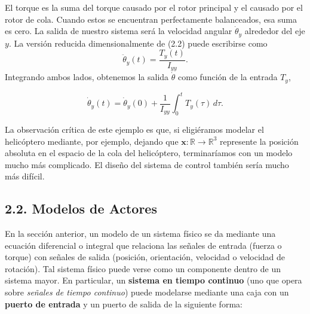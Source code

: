 \documentclass[12pt,a4paper]{article}
\begin{document}
\thispagestyle{fancy}
\fancyhf{} 
\fancyhead[L]{\textit{\textcolor{black}{2.2 MODELO DE ACTORES}}}

\begin{tcolorbox}[colback=blue!10,colframe=blue!40!black]
El torque es la suma del torque causado por el rotor principal y el causado por el rotor de cola. 
Cuando estos se encuentran perfectamente balanceados, esa suma es cero. 
La salida de nuestro sistema será la velocidad angular $\dot{\theta}_y$ alrededor del eje $y$. 
La versión reducida dimensionalmente de (2.2) puede escribirse como
\[
\ddot{\theta}_y(t) = \frac{T_y(t)}{I_{yy}}.
\]
Integrando ambos lados, obtenemos la salida $\dot{\theta}$ como función de la entrada $T_y$,

\[
\dot{\theta}_y(t) = \dot{\theta}_y(0) + \frac{1}{I_{yy}} \int_{0}^{t} T_y(\tau) \, d\tau. \tag{2.4}
\]
\end{tcolorbox}

La observación crítica de este ejemplo es que, si eligiéramos modelar el helicóptero mediante, por ejemplo, 
dejando que $\mathbf{x}: \mathbb{R} \to \mathbb{R}^3$ represente la posición absoluta en el espacio de la cola del helicóptero, 
terminaríamos con un modelo mucho más complicado. 
El diseño del sistema de control también sería mucho más difícil.

\subsection*{2.2. Modelos de Actores}
En la sección anterior, un modelo de un sistema físico se da mediante una ecuación diferencial o integral 
que relaciona las señales de entrada (fuerza o torque) con señales de salida (posición, orientación, velocidad 
o velocidad de rotación). Tal sistema físico puede verse como un componente dentro de un sistema mayor. 
En particular, un \textbf{sistema en tiempo continuo} (uno que opera sobre \textit{señales de tiempo continuo}) 
puede modelarse mediante una caja con un \textbf{puerto de entrada} y un puerto de salida de la siguiente forma:

\begin{center}
\end{center}
\end{document}
